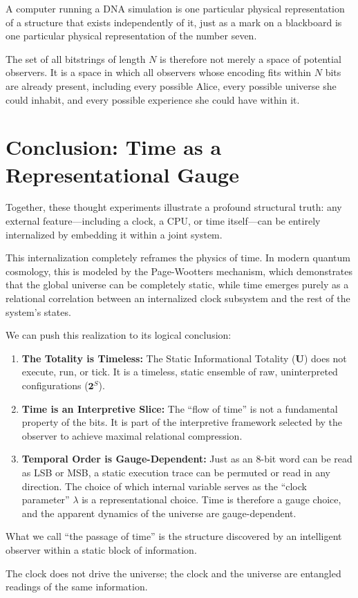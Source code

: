 A computer running a DNA simulation is one particular 
physical representation of a structure that exists independently of it, just as a mark on a 
blackboard is one particular physical representation of the number seven.

The set of all bitstrings of length $N$ is therefore not merely a space of potential observers. 
It is a space in which all observers whose encoding fits within $N$ bits are already present, 
including every possible Alice, every possible universe she could inhabit, and every possible 
experience she could have within it.



\section{Conclusion: Time as a Representational Gauge}

Together, these thought experiments illustrate a profound structural truth: any external feature—including a clock, a CPU, or time itself—can be entirely internalized by embedding it within a joint system.

This internalization completely reframes the physics of time. 
In modern quantum cosmology, this is modeled by the Page-Wootters \cite{page1983clock} mechanism,
which demonstrates that the global universe can be completely static, while time emerges purely as a relational correlation between an internalized clock subsystem and the rest of the system's states. 

We can push this realization to its logical conclusion:

\begin{enumerate}
    \item \textbf{The Totality is Timeless:} The Static Informational Totality ($\mathbf{U}$) does not execute, run, or tick. It is a timeless, static ensemble of raw, uninterpreted configurations ($\mathbf{2}^S$). 
    \item \textbf{Time is an Interpretive Slice:} The ``flow of time'' is not a fundamental property of the bits. It is part of the interpretive framework selected by the observer to achieve maximal relational compression.
    \item \textbf{Temporal Order is Gauge-Dependent:} Just as an 8-bit word can be read as LSB or MSB, a static execution trace can be permuted or read in any direction. The choice of which internal variable serves as the ``clock parameter'' $\lambda$ is a representational choice. Time is therefore a gauge choice, and the apparent dynamics of the universe are gauge-dependent.
\end{enumerate}

What we call ``the passage of time'' is the structure discovered by an intelligent observer within a static block of information.

The clock does not drive the universe; the clock and the universe are entangled readings of the same information.



